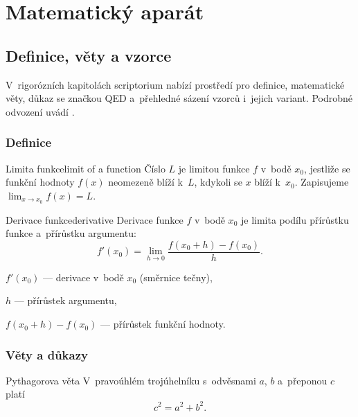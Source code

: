 \documentclass[11pt, a4paper, oneside]{book}
\begin{document}
\part{Matematický aparát}

\chapter{Definice, věty a vzorce}
\label{ch:matematika}

V~rigorózních kapitolách scriptorium nabízí prostředí pro definice, matematické
věty, důkaz se značkou QED a~přehledné sázení vzorců i~jejich variant. Podrobné
odvození uvádí \cite{rektorys}.

\section{Definice}

\begin{pojem}{Limita funkce}{limit of a function}
Číslo $L$ je limitou funkce $f$ v~bodě $x_0$, jestliže se funkční hodnoty
$f(x)$ neomezeně blíží k~$L$, kdykoli se $x$ blíží k~$x_0$. Zapisujeme
$\lim_{x \to x_0} f(x) = L$.
\end{pojem}

\begin{pojem}{Derivace funkce}{derivative}
Derivace funkce $f$ v~bodě $x_0$ je limita podílu přírůstku funkce a~přírůstku
argumentu:
\[ f'(x_0) = \lim_{h \to 0} \frac{f(x_0 + h) - f(x_0)}{h}. \]
\begin{kde}
  \item $f'(x_0)$ — derivace v~bodě $x_0$ (směrnice tečny),
  \item $h$ — přírůstek argumentu,
  \item $f(x_0 + h) - f(x_0)$ — přírůstek funkční hodnoty.
\end{kde}
\end{pojem}

\section{Věty a důkazy}

\begin{veta}{Pythagorova věta}
V~pravoúhlém trojúhelníku s~odvěsnami $a$, $b$ a~přeponou $c$ platí
\[ c^2 = a^2 + b^2. \]
\end{veta}
\end{document}
